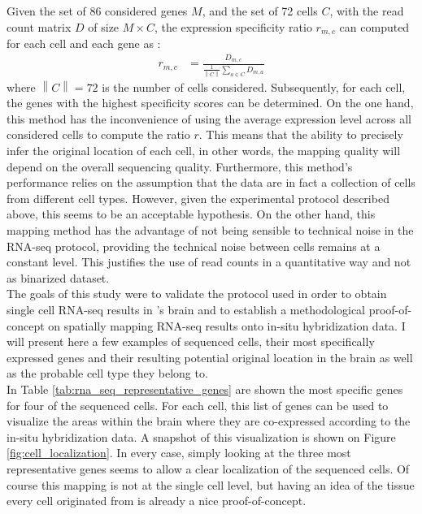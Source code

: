 	Given the set of 86 considered genes $M$, and the set of 72 cells $C$, with the read count matrix $D$ of size $M\times C$, the expression specificity ratio $r_{m,c}$ can computed for each cell and each gene as :
\begin{eqnarray*}
	r_{m,c} &= \frac{D_{m,c}}{\frac{1}{\left\|C\right\|}\sum_{a \in C}D_{m,a}}
\end{eqnarray*}
where $\left\|C\right\| = 72 $ is the number of cells considered. Subsequently, for each cell, the genes with the highest specificity scores can be determined. On the one hand, this method has the inconvenience of using the average expression level across all considered cells to compute the ratio $r$. This means that the ability to precisely infer the original location of each cell, in other words, the mapping quality will depend on the overall sequencing quality. Furthermore, this method's performance relies on the assumption that the data are in fact a collection of cells from different cell types. However, given the experimental protocol described above, this seems to be an acceptable hypothesis. On the other hand, this mapping method has the advantage of not being sensible to technical noise in the RNA-seq protocol, providing the technical noise between cells remains at a constant level. This justifies the use of read counts in a quantitative way and not as binarized dataset.\\

	The goals of this study were to validate the protocol used in order to obtain single cell RNA-seq results in \platy{}'s brain and to establish a methodological proof-of-concept on spatially mapping RNA-seq results onto in-situ hybridization data. I will present here a few examples of sequenced cells, their most specifically expressed genes and their resulting potential original location in the brain as well as the probable cell type they belong to.\\
	
	In Table \ref{tab:rna_seq_representative_genes} are shown the most specific genes for four of the sequenced cells. For each cell, this list of genes can be used to visualize the areas within the brain where they are co-expressed according to the in-situ hybridization data. A snapshot of this visualization is shown on Figure \ref{fig:cell_localization}. In every case, simply looking at the three most representative genes seems to allow a clear localization of the sequenced cells. Of course this mapping is not at the single cell level, but having an idea of the tissue every cell originated from is already a nice proof-of-concept.\\
	
